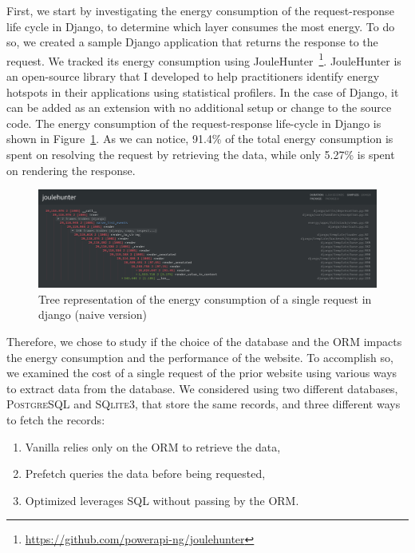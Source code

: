 First, we start by investigating the energy consumption of the request-response life cycle in Django, to determine which layer consumes the most energy.
To do so, we created a sample Django application that returns the response to the request. We tracked its energy consumption using JouleHunter~\footnote{\url{https://github.com/powerapi-ng/joulehunter}}.
JouleHunter is an open-source library that I developed to help practitioners identify energy hotspots in their applications using statistical profilers.
In the case of Django, it can be added as an extension with no additional setup or change to the source code.
The energy consumption of the request-response life-cycle in Django is shown in Figure~\ref{fig:django_life_cycle_naive}.
As we can notice, 91.4\% of the total energy consumption is spent on resolving the request by retrieving the data, while only 5.27\% is spent on rendering the response.

\begin{figure}[!htb]
    \centering
    \includegraphics[width=\linewidth]{imgs/django_life_cycle_naive}
    \caption{Tree representation of the energy consumption of a single request in django (naive version)}
    \label{fig:django_life_cycle_naive}
\end{figure}

Therefore, we chose to study if the choice of the database and the ORM impacts the energy consumption and the performance of the website.
To accomplish so, we examined the cost of a single request of the prior website using various ways to extract data from the database.
We considered using two different databases, \textsc{PostgreSQL} and \textsc{SQlite3}, that store the same records, and three different ways to fetch the records:
\begin{enumerate}
    \item \textsf{Vanilla} relies only on the ORM to retrieve the data,
    \item \textsf{Prefetch} queries the data before being requested,
    \item \textsf{Optimized} leverages SQL without passing by the ORM.
\end{enumerate}

